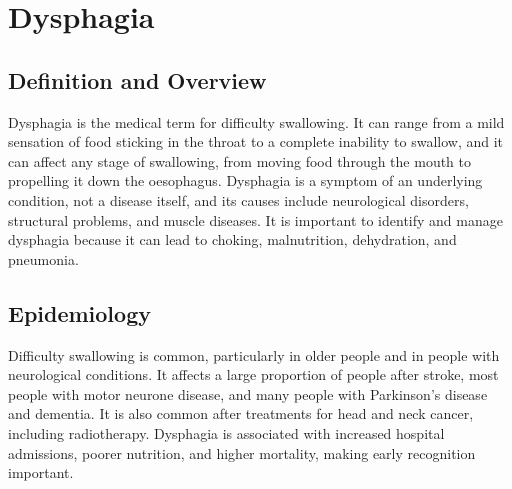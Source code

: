 \chapter{Dysphagia}

\section*{Definition and Overview}
Dysphagia is the medical term for difficulty swallowing. It can range from a mild sensation of food sticking in the throat to a complete inability to swallow, and it can affect any stage of swallowing, from moving food through the mouth to propelling it down the oesophagus. Dysphagia is a symptom of an underlying condition, not a disease itself, and its causes include neurological disorders, structural problems, and muscle diseases. It is important to identify and manage dysphagia because it can lead to choking, malnutrition, dehydration, and pneumonia.

\section*{Epidemiology}
Difficulty swallowing is common, particularly in older people and in people with neurological conditions. It affects a large proportion of people after stroke, most people with motor neurone disease, and many people with Parkinson's disease and dementia. It is also common after treatments for head and neck cancer, including radiotherapy. Dysphagia is associated with increased hospital admissions, poorer nutrition, and higher mortality, making early recognition important.

